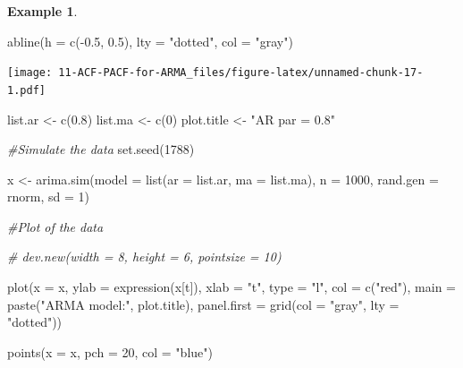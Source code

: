 \documentclass[
]{book}
\newenvironment{Shaded}{\begin{snugshade}}{\end{snugshade}}
\newcommand{\AttributeTok}[1]{\textcolor[rgb]{0.77,0.63,0.00}{#1}}
\newcommand{\CommentTok}[1]{\textcolor[rgb]{0.56,0.35,0.01}{\textit{#1}}}
\newcommand{\DecValTok}[1]{\textcolor[rgb]{0.00,0.00,0.81}{#1}}
\newcommand{\FloatTok}[1]{\textcolor[rgb]{0.00,0.00,0.81}{#1}}
\newcommand{\FunctionTok}[1]{\textcolor[rgb]{0.00,0.00,0.00}{#1}}
\newcommand{\NormalTok}[1]{#1}
\newcommand{\OtherTok}[1]{\textcolor[rgb]{0.56,0.35,0.01}{#1}}
\newcommand{\SpecialCharTok}[1]{\textcolor[rgb]{0.00,0.00,0.00}{#1}}
\newcommand{\StringTok}[1]{\textcolor[rgb]{0.31,0.60,0.02}{#1}}
\theoremstyle{definition}
\theoremstyle{definition}
\newtheorem{example}{Example}[chapter]
\theoremstyle{definition}
\theoremstyle{definition}
\theoremstyle{remark}
\begin{document}
\begin{example}
\begin{Shaded}
\begin{Highlighting}[]
\FunctionTok{abline}\NormalTok{(}\AttributeTok{h =} \FunctionTok{c}\NormalTok{(}\SpecialCharTok{{-}}\FloatTok{0.5}\NormalTok{, }\FloatTok{0.5}\NormalTok{), }\AttributeTok{lty =} \StringTok{"dotted"}\NormalTok{, }\AttributeTok{col =} \StringTok{"gray"}\NormalTok{)}
\end{Highlighting}
\end{Shaded}

\texttt{[image: 11-ACF-PACF-for-ARMA\_files/figure-latex/unnamed-chunk-17-1.pdf]}

\begin{Shaded}
\begin{Highlighting}[]
\NormalTok{list.ar }\OtherTok{\textless{}{-}} \FunctionTok{c}\NormalTok{(}\FloatTok{0.8}\NormalTok{)}
\NormalTok{list.ma }\OtherTok{\textless{}{-}} \FunctionTok{c}\NormalTok{(}\DecValTok{0}\NormalTok{)}
\NormalTok{plot.title }\OtherTok{\textless{}{-}} \StringTok{"AR par = 0.8"}
\end{Highlighting}
\end{Shaded}

\begin{Shaded}
\begin{Highlighting}[]
\CommentTok{\#Simulate the data}
\FunctionTok{set.seed}\NormalTok{(}\DecValTok{1788}\NormalTok{)}
  
\NormalTok{x }\OtherTok{\textless{}{-}} \FunctionTok{arima.sim}\NormalTok{(}\AttributeTok{model =} \FunctionTok{list}\NormalTok{(}\AttributeTok{ar =}\NormalTok{ list.ar, }\AttributeTok{ma =}\NormalTok{ list.ma), }\AttributeTok{n =} \DecValTok{1000}\NormalTok{,}
    \AttributeTok{rand.gen =}\NormalTok{ rnorm, }\AttributeTok{sd =} \DecValTok{1}\NormalTok{)}
  
  
\CommentTok{\#Plot of the data}
  
\CommentTok{\# dev.new(width = 8, height = 6, pointsize = 10)}
  
\FunctionTok{plot}\NormalTok{(}\AttributeTok{x =}\NormalTok{ x, }\AttributeTok{ylab =} \FunctionTok{expression}\NormalTok{(x[t]), }\AttributeTok{xlab =} \StringTok{"t"}\NormalTok{, }\AttributeTok{type =} \StringTok{"l"}\NormalTok{, }\AttributeTok{col =} \FunctionTok{c}\NormalTok{(}\StringTok{"red"}\NormalTok{),  }
    \AttributeTok{main =}  \FunctionTok{paste}\NormalTok{(}\StringTok{"ARMA model:"}\NormalTok{, plot.title),}
    \AttributeTok{panel.first =} \FunctionTok{grid}\NormalTok{(}\AttributeTok{col =} \StringTok{"gray"}\NormalTok{, }\AttributeTok{lty =} \StringTok{"dotted"}\NormalTok{))}
  
\FunctionTok{points}\NormalTok{(}\AttributeTok{x =}\NormalTok{ x, }\AttributeTok{pch =} \DecValTok{20}\NormalTok{, }\AttributeTok{col =} \StringTok{"blue"}\NormalTok{)}
\end{Highlighting}
\end{Shaded}


\end{example}
\end{document}
